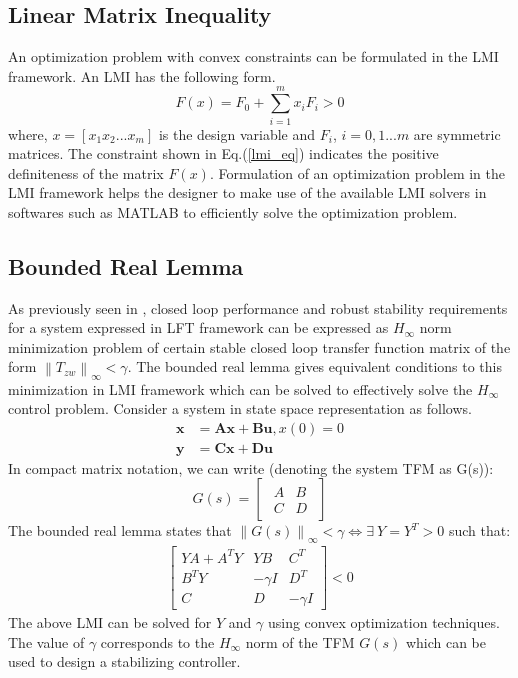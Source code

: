 \documentclass[a4paper,12pt]{article}
\newcommand\norm[1]{\left\lVert#1\right\rVert}
\begin{document}
	\subsection{Linear Matrix Inequality}
	An optimization problem with convex constraints can be formulated in the LMI framework. An LMI has the following form.
		\begin{equation}
			\label{lmi_eq}
			F(x)=F_{0}+\sum_{i=1}^{m}x_{i}F_{i} > 0
		\end{equation}
		where, $x=[x_{1} x_{2} ... x_{m}]$ is the design variable and $F_{i}$, $i=0,1...m$ are symmetric matrices. The constraint shown in Eq.(\ref{lmi_eq}) indicates the positive definiteness of the matrix $F(x)$. Formulation of an optimization problem in the LMI framework helps the designer to make use of the available LMI solvers in softwares such as MATLAB to efficiently solve the optimization problem.
	\subsection{Bounded Real Lemma}
	\label{brl}
	As previously seen in \cite{prev}, closed loop performance and robust stability requirements for a system expressed in LFT framework can be expressed as $H_{\infty}$ norm minimization problem of certain stable closed loop transfer function matrix of the form $\norm{T_{zw}}_{\infty} < \gamma$. 
	The bounded real lemma gives equivalent conditions to this minimization in LMI framework which can be solved to effectively solve the $H_{\infty}$ control problem. Consider a system in state space representation as follows.
	\begin{align}
	\label{ss}
		\textbf{\.x}&=\textbf{Ax} + \textbf{Bu}, x(0)=0\\
		\textbf{y}&=\textbf{Cx} + \textbf{Du}
		\end{align}
		In compact matrix notation, we can write (denoting the system TFM as G(s)):
		\[G(s)=\begin{bmatrix}
		\begin{array}{c|c}
		A & B \\\hline C & D
		\end{array}
		\end{bmatrix}
		\]
		The bounded real lemma states that 
		$\norm{G(s)}_{\infty}<\gamma \Leftrightarrow \exists \: Y = Y^{T} > 0$ such that:
		\begin{align}
		\label{brl_lmi}
		\begin{bmatrix}
		YA+A^{T}Y & YB & C^{T} \\
		B^{T}Y & -\gamma I & D^{T}\\
		C & D & -\gamma I
		\end{bmatrix}
		< 0
		\end{align}
		The above LMI can be solved for $Y$ and $\gamma$ using convex optimization techniques. The value of $\gamma$ corresponds to the $H_{\infty}$ norm of the TFM $G(s)$ which can be used to design a stabilizing controller. 
\end{document}
